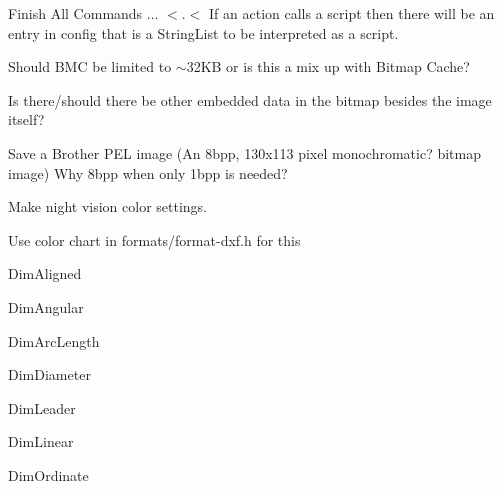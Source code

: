 \begin{DoxyRefList}
Finish All Commands ... \texorpdfstring{$<$}{<}.\texorpdfstring{$<$}{<} If an action calls a script then there will be an entry in config that is a String\+List to be interpreted as a script. 
\item[Member \mbox{\hyperlink{classMdiWindow_a2167cf71975c040208ae05b7b6b10a2f}{Mdi\+Window\+::save\+BMC}} ()]\label{todo__todo000011}%
%
Should BMC be limited to $\sim$32\+KB or is this a mix up with Bitmap Cache? 



Is there/should there be other embedded data in the bitmap besides the image itself? 

\label{todo__todo000010}%
%
Save a Brother PEL image (An 8bpp, 130x113 pixel monochromatic? bitmap image) Why 8bpp when only 1bpp is needed? 
\item[Member \mbox{\hyperlink{mainwindow_8cpp_a9ae7b1e4de8bb7661879f4317d6d3cb9}{night\+\_\+vision\+\_\+action}} (String args)]\label{todo__todo000007}%
%
Make night vision color settings.  
\item[Member \mbox{\hyperlink{embroidermodder_8h_a29bcbce98e36705fa9c1577a227d53c0a21cbc22cd57ac906315fac3d245a25b9}{OBJ\+\_\+\+LTYPE}} ]\label{todo__todo000002}%
%
Use color chart in formats/format-\/dxf.\+h for this  
\item[Member \mbox{\hyperlink{classPropertyEditor_af677b799a39d2374c702087e23fb6b3c}{Property\+Editor\+::clear\+All\+Fields}} ()]\label{todo__todo000026}%
%
Dim\+Aligned 



Dim\+Angular 



Dim\+Arc\+Length 



Dim\+Diameter 



Dim\+Leader 



Dim\+Linear 



Dim\+Ordinate 




\end{DoxyRefList}
